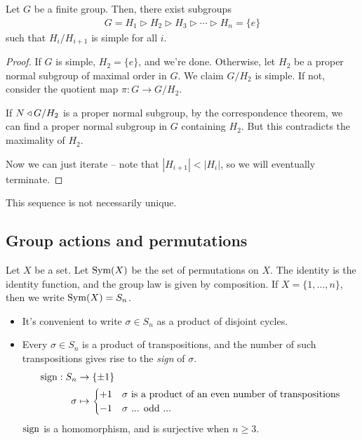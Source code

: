 \documentclass{../../template/note}
\begin{document}
    \begin{theorem}
        Let $G$ be a finite group. Then, there exist subgroups
        \begin{align*}
            G = H_1 \triangleright H_2 \triangleright H_3 \triangleright \cdots \triangleright H_n = \{e\}
        \end{align*}
        such that $H_i/H_{i+1}$ is simple for all $i$.        
    \end{theorem}
    
    \begin{proof}
        If $G$ is simple, $H_2 = \{e\}$, and we're done. Otherwise, let $H_2$ be a proper normal subgroup of maximal order in $G$. We claim $G/H_2$ is simple. If not, consider the quotient map $\pi: G \to G/H_2$.

        If $N \triangleleft G/H_2$ is a proper normal subgroup, by the correspondence theorem, we can find a proper normal subgroup in $G$ containing $H_2$. But this contradicts the maximality of $H_2$.

        Now we can just iterate -- note that $|H_{i+1}| < |H_i|$, so we will eventually terminate.
    \end{proof}
    
    \begin{remark*}
        This sequence is not necessarily unique.
    \end{remark*}
    
    \subsection{Group actions and permutations}

    \begin{definition}
        Let $X$ be a set. Let $\operatorname{Sym}(X)$ be the set of permutations on $X$. The identity is the identity function, and the group law is given by composition. If $X = \{1, \dots, n\}$, then we write $\operatorname{Sym}(X) = S_n$.
    \end{definition}
    
    \begin{itemize}
        \item It's convenient to write $\sigma \in S_n$ as a product of disjoint cycles.
        \item Every $\sigma \in S_n$ is a product of transpositions, and the number of such transpositions gives rise to the \emph{sign} of $\sigma$.
        \begin{align*}
            \operatorname{sign}: S_n &\to \{\pm 1\} \\
            \sigma &\mapsto \begin{cases}
                +1 & \sigma \text{ is a product of an even number of transpositions} \\
                -1 & \sigma \text{ ... odd ...}
            \end{cases}
        \end{align*}
        $\operatorname{sign}$ is a homomorphism, and is surjective when $n \geq 3$.
        
    \end{itemize}
    
\end{document}
